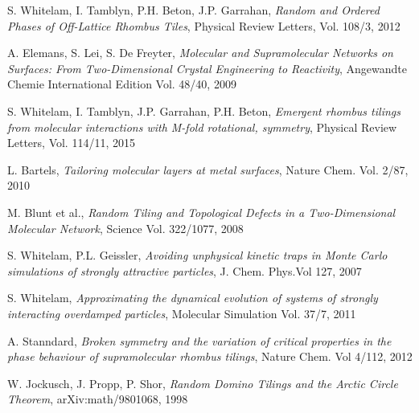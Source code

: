 \documentclass[a4paper,twocolumn]{revtex4}
\begin{document}
\footnotesize{
\begin{thebibliography}{9}
 
 S. Whitelam, I. Tamblyn,  P.H. Beton, J.P. Garrahan,
\emph{Random and Ordered Phases of Off-Lattice Rhombus Tiles},
Physical Review Letters, Vol. 108/3,
2012 
  
A. Elemans, S. Lei, S. De Freyter,
\emph{Molecular and Supramolecular Networks on Surfaces: From Two-Dimensional Crystal Engineering to Reactivity},
Angewandte Chemie International Edition Vol. 48/40,
2009

  
 S. Whitelam, I. Tamblyn, J.P. Garrahan, P.H. Beton,
\emph{Emergent rhombus tilings from molecular interactions with M-fold rotational,
symmetry},
Physical Review Letters, Vol. 114/11,
2015  

L. Bartels,
\emph{Tailoring molecular layers at metal surfaces},
Nature Chem. Vol. 2/87,
2010

M. Blunt et al.,
\emph{Random Tiling and Topological Defects in a Two-Dimensional Molecular Network},
Science Vol. 322/1077,
2008

S. Whitelam, P.L. Geissler,
\emph{Avoiding  unphysical kinetic traps in Monte Carlo simulations of strongly attractive particles},
J. Chem. Phys.Vol 127,
2007

S. Whitelam,
\emph{Approximating the dynamical evolution of systems of strongly interacting overdamped particles},
Molecular Simulation Vol. 37/7,
2011

A. Stanndard,
\emph{Broken symmetry and the variation of critical properties in the phase behaviour of supramolecular rhombus tilings},
Nature Chem. Vol 4/112,
2012

W. Jockusch, J. Propp, P. Shor,
\emph{Random Domino Tilings and the Arctic Circle Theorem},
arXiv:math/9801068,
1998

\end{thebibliography}

}
\end{document}
